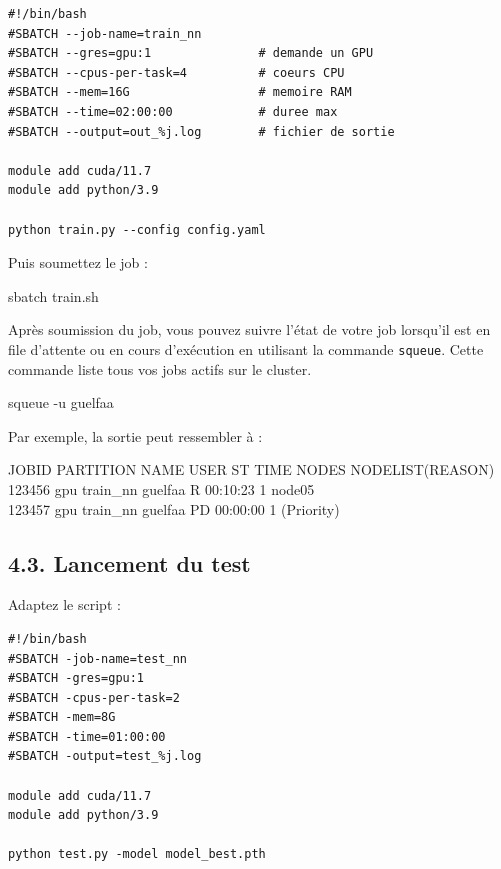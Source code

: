 \documentclass[a4paper,12pt]{article}
\begin{document}
\begin{lstlisting}[caption=Exemple de script Slurm (train.sh)]
#!/bin/bash
#SBATCH --job-name=train_nn
#SBATCH --gres=gpu:1               # demande un GPU
#SBATCH --cpus-per-task=4          # coeurs CPU
#SBATCH --mem=16G                  # memoire RAM
#SBATCH --time=02:00:00            # duree max
#SBATCH --output=out_%j.log        # fichier de sortie

module add cuda/11.7
module add python/3.9

python train.py --config config.yaml
\end{lstlisting}

Puis soumettez le job :
\begin{terminal}
sbatch train.sh
\end{terminal}



Après soumission du job, vous pouvez suivre l'état de votre job lorsqu'il est en file d'attente ou en cours d'exécution en utilisant la commande \texttt{squeue}. Cette commande liste tous vos jobs actifs sur le cluster.

\begin{terminal}
squeue -u guelfaa
\end{terminal}

Par exemple, la sortie peut ressembler à :

\begin{terminal}
JOBID   PARTITION  NAME      USER     ST       TIME  NODES NODELIST(REASON)\\
123456  gpu        train\_nn  guelfaa  R    00:10:23     1    node05\\
123457  gpu        train\_nn  guelfaa  PD   00:00:00     1    (Priority)
\end{terminal}

\subsection{4.3. Lancement du test}
Adaptez le script :
\begin{lstlisting}[caption=Exemple de script Slurm (test.sh)]
#!/bin/bash
#SBATCH -job-name=test_nn
#SBATCH -gres=gpu:1
#SBATCH -cpus-per-task=2
#SBATCH -mem=8G
#SBATCH -time=01:00:00
#SBATCH -output=test_%j.log

module add cuda/11.7
module add python/3.9

python test.py -model model_best.pth
\end{lstlisting}
\end{document}

